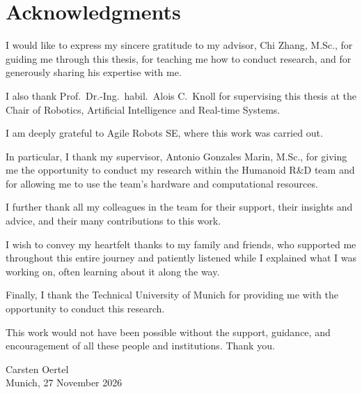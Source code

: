 \chapter*{Acknowledgments}%
%
\begingroup%
\setlength{\parindent}{0pt}%
\setlength{\parskip}{1em}%
I would like to express my sincere gratitude to my advisor, Chi Zhang, M.Sc., for guiding me through this thesis, for teaching me how to conduct research, and for generously sharing his expertise with me.

I also thank Prof.\ Dr.-Ing.\ habil.\ Alois C.\ Knoll for supervising this thesis at the Chair of Robotics, Artificial Intelligence and Real-time Systems.

I am deeply grateful to Agile Robots SE, where this work was carried out.

In particular, I thank my supervisor, Antonio Gonzales Marin, M.Sc., for giving me the opportunity to conduct my research within the Humanoid R\&D team and for allowing me to use the team's hardware and computational resources.

I further thank all my colleagues in the team for their support, their insights and advice, and their many contributions to this work.

I wish to convey my heartfelt thanks to my family and friends, who supported me throughout this entire journey and patiently listened while I explained what I was working on, often learning about it along the way.

Finally, I thank the Technical University of Munich for providing me with the opportunity to conduct this research.

This work would not have been possible without the support, guidance, and encouragement of all these people and institutions. Thank you.

\vspace{1em}%
\begin{flushright}%
Carsten Oertel\\%
Munich, 27 November 2026%
\end{flushright}%
\par\endgroup%
\cleardoublepage%
